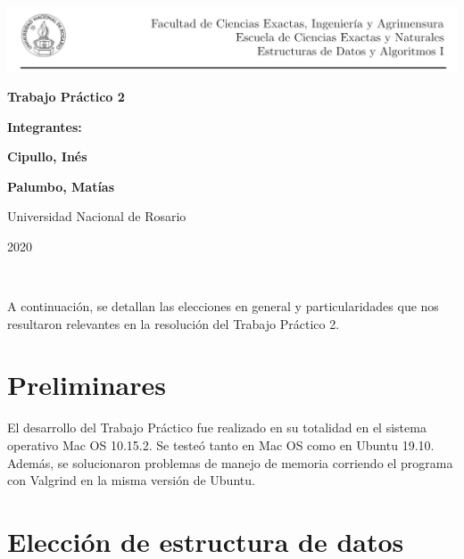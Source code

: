 \documentclass[11pt]{article}
\begin{document}
\begin{titlepage}
    \hspace{-1.2cm}\includegraphics[scale= 0.8]{header2}
    \begin{center}
        \vfill
        \vfill
            \vspace{0.7cm}
            \noindent\textbf{\Huge Trabajo Práctico 2}\par
            \vspace{.5cm}
        \vfill
        \noindent \textbf{\huge Integrantes:}\par
        \vspace{.5cm}
        \noindent \textbf{\Large Cipullo, Inés}\par
        \noindent \textbf{\Large Palumbo, Matías}\par
 
        \vfill
        \large Universidad Nacional de Rosario \par
        \noindent\large 2020
    \end{center}
\end{titlepage}
\ \par


 \noindent A continuación, se detallan las elecciones en general y particularidades que nos resultaron relevantes en la resolución del Trabajo Práctico 2.\par

 \section{Preliminares}
 
 El desarrollo del Trabajo Práctico fue realizado en su totalidad en el sistema operativo Mac OS 10.15.2. Se testeó tanto en Mac OS como en Ubuntu 19.10. Además, se solucionaron problemas de manejo de memoria corriendo el programa con Valgrind en la misma versión de Ubuntu. \par
 
 \section{Elección de estructura de datos}
 
\end{document}
